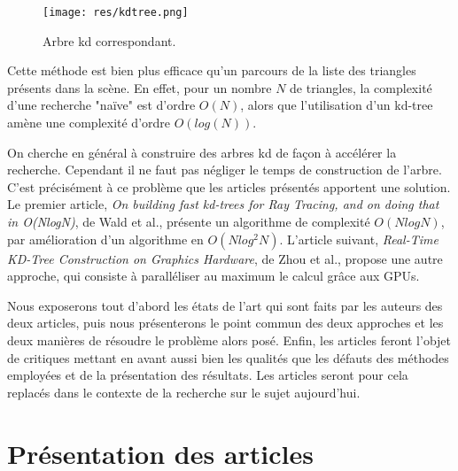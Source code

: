 \documentclass[a4paper]{article}
\begin{document}
\begin{figure}[!h]
\centering
\texttt{[image: res/kdtree.png]}
\caption{\label{fig:kdtree}Arbre kd correspondant.}
\end{figure}

Cette méthode est bien plus efficace qu'un parcours de la liste des triangles présents dans la scène. En effet, pour un nombre $N$ de triangles, la complexité d'une recherche "naïve" est d'ordre $O(N)$, alors que l'utilisation d'un kd-tree amène une complexité d'ordre $O(log(N))$.

On cherche en général à construire des arbres kd de façon à accélérer la recherche. Cependant il ne faut pas négliger le temps de construction de l'arbre. C'est précisément à ce problème que les articles présentés apportent une solution. Le premier article, \textit{On building fast kd-trees for Ray Tracing, and on doing that in O(NlogN)}, de Wald et al., présente un algorithme de complexité $O(NlogN)$, par amélioration d'un algorithme en $O(Nlog^2N)$. L'article suivant, \textit{Real-Time KD-Tree Construction on Graphics Hardware}, de Zhou et al., propose une autre approche, qui consiste à paralléliser au maximum le calcul grâce aux GPUs.

Nous exposerons tout d'abord les états de l'art qui sont faits par les auteurs des deux articles, puis nous présenterons le point commun des deux approches et les deux manières de résoudre le problème alors posé. Enfin, les articles feront l'objet de critiques mettant en avant aussi bien les qualités que les défauts des méthodes employées et de la présentation des résultats. Les articles seront pour cela replacés dans le contexte de la recherche sur le sujet aujourd'hui.

\section{Présentation des articles}
\end{document}
